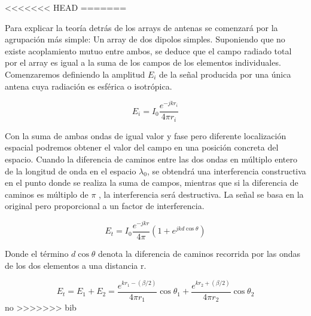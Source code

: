 <<<<<<< HEAD
=======
\par Para explicar la teoría detrás de los arrays de antenas se comenzará por la agrupación más simple: Un array de dos dipolos simples. Suponiendo que no existe acoplamiento mutuo entre ambos, se deduce que el campo radiado total por el array es igual a la suma de los campos de los elementos individuales. Comenzaremos definiendo la amplitud \textit{$E_{i}$} de la señal producida por una única antena cuya radiación es esférica o isotrópica. 

\begin{equation}
	E_{i}=I_{0}\frac{e^{-jkr_{i}}}{4\pi r_{i}}
	\label{eq:ei}
\end{equation}


\par Con la suma de ambas ondas de igual valor y fase pero diferente localización espacial podremos obtener el valor del campo en una posición concreta del espacio. Cuando la diferencia de caminos entre las dos ondas en múltiplo entero de la longitud de onda en el espacio \textit{$\lambda _{0}$}, se obtendrá una interferencia constructiva en el punto donde se realiza la suma de campos, mientras que si la diferencia de caminos es múltiplo de $\pi$ , la interferencia será destructiva. La señal se basa en la original pero proporcional a un factor de interferencia.

\begin{equation}
	E_{t}=I_{0}\frac{e^{-jkr}}{4\pi}(1+e^{jkd\cos\theta })
	\label{eq:einter}
\end{equation}

Donde el término $d\cos\theta$ denota la diferencia de caminos recorrida por las ondas de los dos elementos a una distancia r.

\begin{equation}
	E_{t}=E_{1}+E_{2}=\frac{    e^{kr_{1}-(\beta/2)} }{ 4\pi r_{1}  }\cos\theta _{1}+\frac{    e^{kr_{2}+(\beta/2)} }{ 4\pi r_{2}  }\cos\theta _{2}
	\label{eq:ei}
\end{equation}
no
>>>>>>> bib
